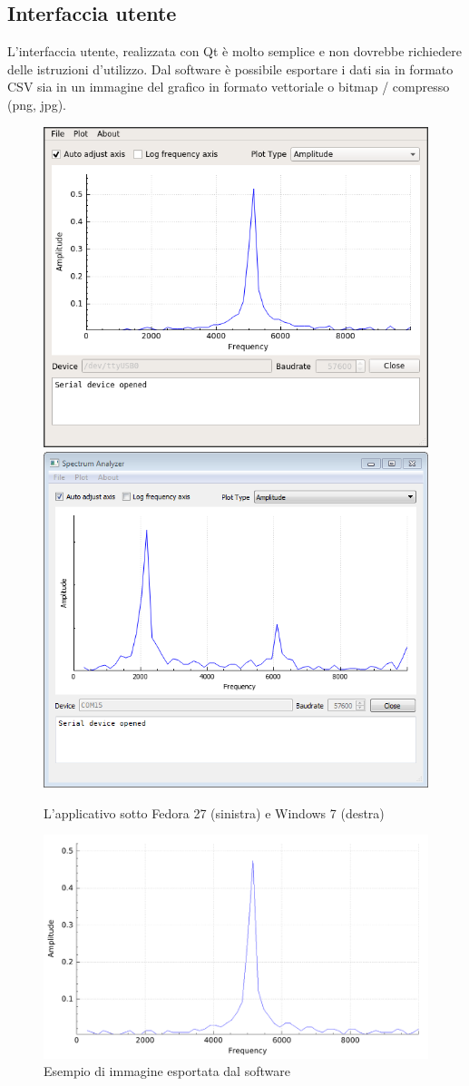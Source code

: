 \subsection{Interfaccia utente}
L'interfaccia utente, realizzata con Qt \`e molto semplice e non dovrebbe
richiedere delle istruzioni d'utilizzo.
Dal software \`e possibile esportare i dati sia in formato CSV sia in un
immagine del grafico in formato vettoriale o bitmap / compresso (png, jpg).
\begin{figure}[H] \centering
	\includegraphics[width=.45\textwidth]{figures/screenshots/desktop-fedora-sine}
	\includegraphics[width=.45\textwidth]{figures/screenshots/desktop-windows7-square}
    \caption{L'applicativo sotto Fedora 27 (sinistra) e Windows 7 (destra)}
\end{figure}
\begin{figure}[H] \centering
	\includegraphics[width=.8\linewidth]{figures/screenshots/desktop-exported-sine-wave-img}
    \caption{Esempio di immagine esportata dal software}
\end{figure}

